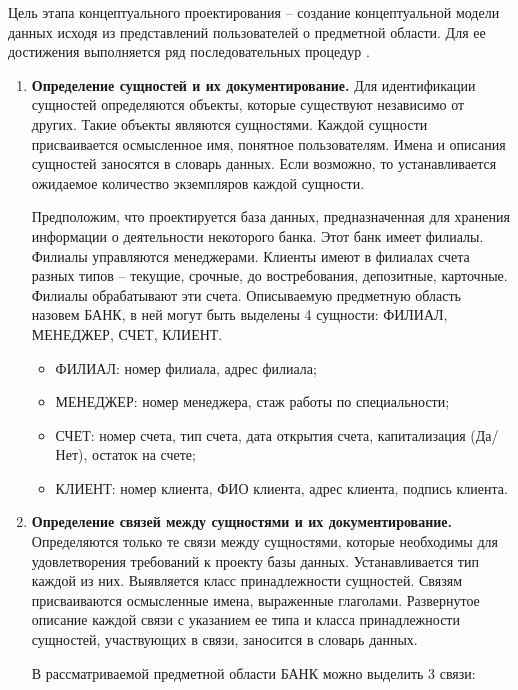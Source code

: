 Цель этапа концептуального проектирования – создание концептуальной модели данных исходя из представлений
пользователей о предметной области. Для ее достижения выполняется ряд последовательных процедур \autocite{oscerko}.
\begin{enumerate}
	\item \textbf{Определение сущностей и их документирование.}
	Для идентификации сущностей определяются объекты, которые существуют независимо от других. Такие объекты
	являются сущностями. Каждой сущности присваивается осмысленное имя, понятное пользователям. Имена и
	описания сущностей заносятся в словарь данных. Если возможно, то устанавливается ожидаемое количество
	экземпляров каждой сущности.
	
	Предположим, что проектируется база данных, предназначенная для хранения информации о деятельности некоторого банка. Этот банк
	имеет филиалы. Филиалы управляются менеджерами. Клиенты имеют в филиалах счета разных типов – текущие, срочные, до востребования, депозитные, карточные.
	Филиалы обрабатывают эти счета. Описываемую предметную область назовем БАНК, в ней могут быть выделены 4 сущности: ФИЛИАЛ, МЕНЕДЖЕР, СЧЕТ, КЛИЕНТ.
	\begin{itemize}
		
		\item ФИЛИАЛ: номер филиала, адрес филиала;
		
		\item МЕНЕДЖЕР: номер менеджера, стаж работы по специальности;
		
		\item СЧЕТ: номер счета, тип счета, дата открытия счета, капитализация (Да/Нет), остаток на счете;
		
		\item КЛИЕНТ: номер клиента, ФИО клиента, адрес клиента, подпись клиента.
		
	\end{itemize}
	
	\item \textbf{Определение связей между сущностями и их документирование.}
	Определяются только те связи между сущностями, которые необходимы для удовлетворения требований к проекту
	базы данных. Устанавливается тип каждой из них. Выявляется класс принадлежности сущностей. Связям
	присваиваются осмысленные имена, выраженные глаголами. Развернутое описание каждой связи с указанием ее
	типа и класса принадлежности сущностей, участвующих в связи, заносится в словарь данных.
	
	В рассматриваемой предметной области БАНК можно выделить 3 связи:
	\begin{itemize}
		

\end{itemize}
\end{enumerate}
